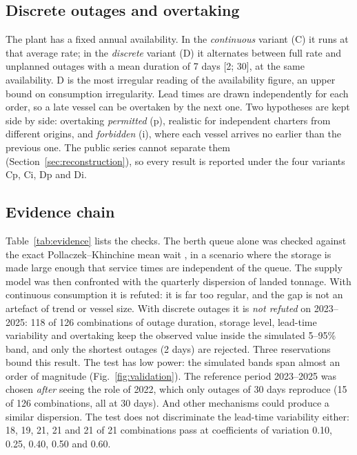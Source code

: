\documentclass[conference]{IEEEtran}   %
\begin{document}
\subsection{Discrete outages and overtaking}
The plant has a fixed annual availability. In the \emph{continuous} variant (C) it runs at
that average rate; in the \emph{discrete} variant (D) it alternates between full rate and
unplanned outages with a mean duration of 7 days [2; 30], at the same availability. D is the
most irregular reading of the availability figure, an upper bound on consumption
irregularity. Lead times are drawn independently for each order, so a late vessel can be
overtaken by the next one. Two hypotheses are kept side by side: overtaking \emph{permitted}
(p), realistic for independent charters from different origins, and \emph{forbidden} (i), where
each vessel arrives no earlier than the previous one. The public series cannot separate them
(Section~\ref{sec:reconstruction}), so every result is reported under the four variants Cp,
Ci, Dp and Di.

\subsection{Evidence chain}
Table~\ref{tab:evidence} lists the checks. The berth queue alone was checked against the
exact Pollaczek--Khinchine mean wait \cite{gross2008}, in a scenario where the
storage is made large enough that service times are independent of the queue. The supply
model was then confronted with the quarterly dispersion of landed tonnage. With continuous
consumption it is refuted: it is far too regular, and the gap is not an artefact of trend or
vessel size. With discrete outages it is \emph{not refuted} on 2023--2025: 118 of 126
combinations of outage duration, storage level, lead-time variability and overtaking keep
the observed value inside the simulated 5--95\% band, and only the shortest outages (2 days)
are rejected. Three reservations bound this result. The test has low power: the simulated
bands span almost an order of magnitude (Fig.~\ref{fig:validation}). The reference period
2023--2025 was chosen \emph{after} seeing the role of 2022, which only outages of 30 days
reproduce (15 of 126 combinations, all at 30 days). And other mechanisms could produce a
similar dispersion. The test does not discriminate the lead-time variability either:
18, 19, 21, 21 and 21 of 21 combinations pass at coefficients of variation 0.10, 0.25, 0.40,
0.50 and 0.60.
\end{document}
